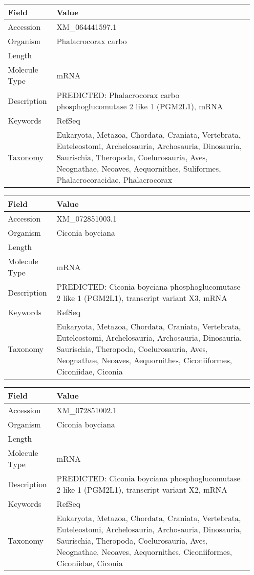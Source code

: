 \documentclass[10pt]{article}
\begin{document}
{\footnotesize
\begin{longtable}{>{\raggedright\arraybackslash}p{4.5cm} >{\raggedright\arraybackslash}p{11.5cm}}
\textbf{Field} & \textbf{Value} \\
\hline
Accession & XM\_064441597.1 \\
Organism & Phalacrocorax carbo \\
Length & 6095 \\
Molecule Type & mRNA \\
Description & PREDICTED: Phalacrocorax carbo phosphoglucomutase 2 like 1 (PGM2L1), mRNA \\
Keywords & RefSeq \\
Taxonomy & Eukaryota, Metazoa, Chordata, Craniata, Vertebrata, Euteleostomi, Archelosauria, Archosauria, Dinosauria, Saurischia, Theropoda, Coelurosauria, Aves, Neognathae, Neoaves, Aequornithes, Suliformes, Phalacrocoracidae, Phalacrocorax \\
\end{longtable}
}

{\footnotesize
\begin{longtable}{>{\raggedright\arraybackslash}p{4.5cm} >{\raggedright\arraybackslash}p{11.5cm}}
\textbf{Field} & \textbf{Value} \\
\hline
Accession & XM\_072851003.1 \\
Organism & Ciconia boyciana \\
Length & 6243 \\
Molecule Type & mRNA \\
Description & PREDICTED: Ciconia boyciana phosphoglucomutase 2 like 1 (PGM2L1), transcript variant X3, mRNA \\
Keywords & RefSeq \\
Taxonomy & Eukaryota, Metazoa, Chordata, Craniata, Vertebrata, Euteleostomi, Archelosauria, Archosauria, Dinosauria, Saurischia, Theropoda, Coelurosauria, Aves, Neognathae, Neoaves, Aequornithes, Ciconiiformes, Ciconiidae, Ciconia \\
\end{longtable}
}

{\footnotesize
\begin{longtable}{>{\raggedright\arraybackslash}p{4.5cm} >{\raggedright\arraybackslash}p{11.5cm}}
\textbf{Field} & \textbf{Value} \\
\hline
Accession & XM\_072851002.1 \\
Organism & Ciconia boyciana \\
Length & 6166 \\
Molecule Type & mRNA \\
Description & PREDICTED: Ciconia boyciana phosphoglucomutase 2 like 1 (PGM2L1), transcript variant X2, mRNA \\
Keywords & RefSeq \\
Taxonomy & Eukaryota, Metazoa, Chordata, Craniata, Vertebrata, Euteleostomi, Archelosauria, Archosauria, Dinosauria, Saurischia, Theropoda, Coelurosauria, Aves, Neognathae, Neoaves, Aequornithes, Ciconiiformes, Ciconiidae, Ciconia \\
\end{longtable}
}
\end{document}
